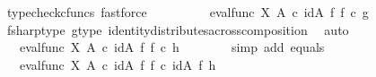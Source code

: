 \begin{isabellebody}
\ {\isacharparenleft}{\kern0pt}typecheck{\isacharunderscore}{\kern0pt}cfuncs{\isacharcomma}{\kern0pt}\ fastforce{\isacharparenright}{\kern0pt}\isanewline
\ \ \ \ \isamarkupfalse%
\ \isamarkupfalse%
\ {\isachardoublequoteopen}{\isachardot}{\kern0pt}{\isachardot}{\kern0pt}{\isachardot}{\kern0pt}\ {\isacharequal}{\kern0pt}\ eval{\isacharunderscore}{\kern0pt}func\ X\ A\ {\isasymcirc}\isactrlsub c\ {\isacharparenleft}{\kern0pt}id{\isacharparenleft}{\kern0pt}A{\isacharparenright}{\kern0pt}\ {\isasymtimes}\isactrlsub f\ {\isacharparenleft}{\kern0pt}f\isactrlsup {\isasymsharp}\ {\isasymcirc}\isactrlsub c\ g{\isacharparenright}{\kern0pt}{\isacharparenright}{\kern0pt}{\isachardoublequoteclose}\isanewline
\ \ \ \ \ \ \isamarkupfalse%
\ f{\isacharunderscore}{\kern0pt}sharp{\isacharunderscore}{\kern0pt}type{}\ g{\isacharunderscore}{\kern0pt}type{}\ identity{\isacharunderscore}{\kern0pt}distributes{\isacharunderscore}{\kern0pt}across{\isacharunderscore}{\kern0pt}composition\ \isamarkupfalse%
\ auto\isanewline
\ \ \ \ \isamarkupfalse%
\ \isamarkupfalse%
\ {\isachardoublequoteopen}{\isachardot}{\kern0pt}{\isachardot}{\kern0pt}{\isachardot}{\kern0pt}\ {\isacharequal}{\kern0pt}\ eval{\isacharunderscore}{\kern0pt}func\ X\ A\ {\isasymcirc}\isactrlsub c\ {\isacharparenleft}{\kern0pt}id{\isacharparenleft}{\kern0pt}A{\isacharparenright}{\kern0pt}\ {\isasymtimes}\isactrlsub f\ {\isacharparenleft}{\kern0pt}f\isactrlsup {\isasymsharp}\ {\isasymcirc}\isactrlsub c\ h{\isacharparenright}{\kern0pt}{\isacharparenright}{\kern0pt}{\isachardoublequoteclose}\isanewline
\ \ \ \ \ \ \isamarkupfalse%
\ {\isacharparenleft}{\kern0pt}simp\ add{\isacharcolon}{\kern0pt}\ equals{\isacharparenright}{\kern0pt}\isanewline
\ \ \ \ \isamarkupfalse%
\ \isamarkupfalse%
\ {\isachardoublequoteopen}{\isachardot}{\kern0pt}{\isachardot}{\kern0pt}{\isachardot}{\kern0pt}\ {\isacharequal}{\kern0pt}\ eval{\isacharunderscore}{\kern0pt}func\ X\ A\ {\isasymcirc}\isactrlsub c\ {\isacharparenleft}{\kern0pt}{\isacharparenleft}{\kern0pt}id{\isacharparenleft}{\kern0pt}A{\isacharparenright}{\kern0pt}\ {\isasymtimes}\isactrlsub f\ f\isactrlsup {\isasymsharp}{\isacharparenright}{\kern0pt}\ {\isasymcirc}\isactrlsub c\ {\isacharparenleft}{\kern0pt}id{\isacharparenleft}{\kern0pt}A{\isacharparenright}{\kern0pt}\ {\isasymtimes}\isactrlsub f\ h{\isacharparenright}{\kern0pt}{\isacharparenright}{\kern0pt}{\isachardoublequoteclose}\isanewline
\ \ \ \ \ \ \isamarkupfalse%

\end{isabellebody}
